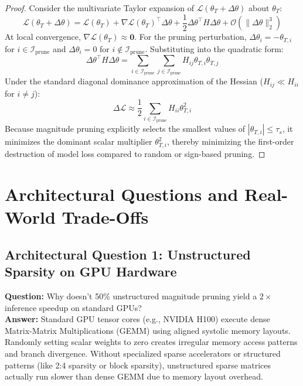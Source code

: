 \documentclass[11pt,a4paper]{article}
\theoremstyle{definition}
\begin{document}
\begin{proof}
Consider the multivariate Taylor expansion of $\mathcal{L}(\theta_T + \Delta \theta)$ about $\theta_T$:
\begin{equation}
\mathcal{L}(\theta_T + \Delta \theta) = \mathcal{L}(\theta_T) + \nabla \mathcal{L}(\theta_T)^\top \Delta \theta + \frac{1}{2} \Delta \theta^\top H \Delta \theta + \mathcal{O}(\|\Delta \theta\|_2^3)
\end{equation}
At local convergence, $\nabla \mathcal{L}(\theta_T) \approx \mathbf{0}$.
For the pruning perturbation, $\Delta \theta_i = -\theta_{T, i}$ for $i \in \mathcal{I}_{\text{prune}}$ and $\Delta \theta_i = 0$ for $i \notin \mathcal{I}_{\text{prune}}$.
Substituting into the quadratic form:
\begin{equation}
\Delta \theta^\top H \Delta \theta = \sum_{i \in \mathcal{I}_{\text{prune}}} \sum_{j \in \mathcal{I}_{\text{prune}}} H_{ij} \theta_{T, i} \theta_{T, j}
\end{equation}
Under the standard diagonal dominance approximation of the Hessian ($H_{ij} \ll H_{ii}$ for $i \neq j$):
\begin{equation}
\Delta \mathcal{L} \approx \frac{1}{2} \sum_{i \in \mathcal{I}_{\text{prune}}} H_{ii} \theta_{T, i}^2
\end{equation}
Because magnitude pruning explicitly selects the smallest values of $|\theta_{T, i}| \le \tau_s$, it minimizes the dominant scalar multiplier $\theta_{T, i}^2$, thereby minimizing the first-order destruction of model loss compared to random or sign-based pruning.
\end{proof}

\section{Architectural Questions and Real-World Trade-Offs}

\subsection{Architectural Question 1: Unstructured Sparsity on GPU Hardware}
\textbf{Question:} Why doesn't 50\% unstructured magnitude pruning yield a $2\times$ inference speedup on standard GPUs?\\
\textbf{Answer:} Standard GPU tensor cores (e.g., NVIDIA H100) execute dense Matrix-Matrix Multiplications (GEMM) using aligned systolic memory layouts. Randomly setting scalar weights to zero creates irregular memory access patterns and branch divergence. Without specialized sparse accelerators or structured patterns (like 2:4 sparsity or block sparsity), unstructured sparse matrices actually run slower than dense GEMM due to memory layout overhead.
\end{document}

